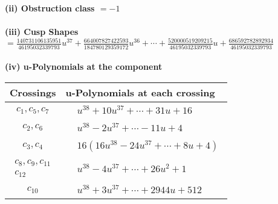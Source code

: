 \documentclass[1p]{elsarticle_modified}
\theoremstyle{definition}
\begin{document}
\flushleft \textbf{(ii) Obstruction class $= -1$}\\~\\
\flushleft \textbf{(iii) Cusp Shapes $= \frac{140731106135951}{46195032339793} u^{37}+\frac{664007827422593}{184780129359172} u^{36}+\cdots+\frac{520000519209215}{46195032339793} u+\frac{686592782892934}{46195032339793}$}\\~\\
\newpage\renewcommand{\arraystretch}{1}
\flushleft \textbf{(iv) u-Polynomials at the component}\newline \\
\begin{tabular}{m{50pt}|m{274pt}}
Crossings & \hspace{64pt}u-Polynomials at each crossing \\
\hline $$\begin{aligned}c_{1},c_{5},c_{7}\end{aligned}$$&$\begin{aligned}
&u^{38}+10 u^{37}+\cdots+31 u+16
\end{aligned}$\\
\hline $$\begin{aligned}c_{2},c_{6}\end{aligned}$$&$\begin{aligned}
&u^{38}-2 u^{37}+\cdots-11 u+4
\end{aligned}$\\
\hline $$\begin{aligned}c_{3},c_{4}\end{aligned}$$&$\begin{aligned}
&16(16 u^{38}-24 u^{37}+\cdots+8 u+4)
\end{aligned}$\\
\hline $$\begin{aligned}c_{8},c_{9},c_{11}\\c_{12}\end{aligned}$$&$\begin{aligned}
&u^{38}-4 u^{37}+\cdots+26 u^2+1
\end{aligned}$\\
\hline $$\begin{aligned}c_{10}\end{aligned}$$&$\begin{aligned}
&u^{38}+3 u^{37}+\cdots+2944 u+512
\end{aligned}$\\
\hline
\end{tabular}\\~\\
\end{document}
